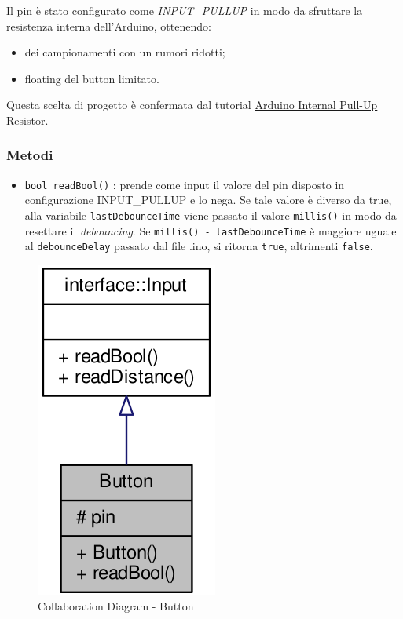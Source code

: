 Il pin è stato configurato come \textit{INPUT\_PULLUP} in modo da sfruttare la resistenza interna dell'Arduino, ottenendo:
\begin{itemize}
	\item dei campionamenti con un rumori ridotti;
	\item floating del button limitato.
\end{itemize}
Questa scelta di progetto è confermata dal tutorial \href{http://tinyurl.com/jqp8nwu}{Arduino Internal Pull-Up Resistor}.
\subsubsection{Metodi}
\begin{itemize}
	\item \texttt{bool readBool()} : prende come input il valore del pin disposto in configurazione INPUT\_PULLUP e lo nega. Se tale valore è diverso da true, alla variabile \texttt{lastDebounceTime} viene passato il valore \texttt{millis()} in modo da resettare il \textit{debouncing}.
	Se \texttt{millis() - lastDebounceTime} è maggiore uguale al \texttt{debounceDelay} passato dal file .ino, si ritorna \texttt{true}, altrimenti \texttt{false}.
\end{itemize}
\begin{figure}[!ht]
	\centering
	\includegraphics[scale=.35]{img/UML/CollaborationDiagram/Button.png}
	\caption{Collaboration Diagram - Button}
\end{figure}
